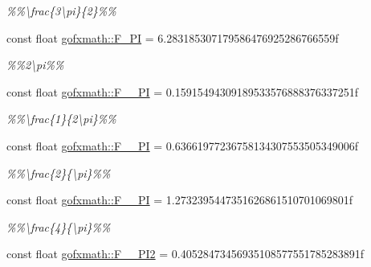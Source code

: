 \begin{DoxyCompactItemize}
\begin{DoxyCompactList}\small\item\em \%\%\textbackslash{}frac\{3\textbackslash{}pi\}\{2\}\%\% \end{DoxyCompactList}\item 
\hypertarget{group___scalar_math_consts_ga1f732c1484129c0ec49718665c5334a9}{}const float \hyperlink{group___scalar_math_consts_ga1f732c1484129c0ec49718665c5334a9}{gofxmath\+::\+F\+\_\+P\+I} = 6.\+283185307179586476925286766559f\label{group___scalar_math_consts_ga1f732c1484129c0ec49718665c5334a9}

\begin{DoxyCompactList}\small\item\em \%\%2\textbackslash{}pi\%\% \end{DoxyCompactList}\item 
\hypertarget{group___scalar_math_consts_ga1e7d6dc0fa11f4284b6f0eaa5b08a351}{}const float \hyperlink{group___scalar_math_consts_ga1e7d6dc0fa11f4284b6f0eaa5b08a351}{gofxmath\+::\+F\+\_\+\_\+P\+I} = 0.\+15915494309189533576888376337251f\label{group___scalar_math_consts_ga1e7d6dc0fa11f4284b6f0eaa5b08a351}

\begin{DoxyCompactList}\small\item\em \%\%\textbackslash{}frac\{1\}\{2\textbackslash{}pi\}\%\% \end{DoxyCompactList}\item 
\hypertarget{group___scalar_math_consts_gaaf7b5cfd9c005c51df9c94cbfeb77b2c}{}const float \hyperlink{group___scalar_math_consts_gaaf7b5cfd9c005c51df9c94cbfeb77b2c}{gofxmath\+::\+F\+\_\+\_\+\+P\+I} = 0.\+63661977236758134307553505349006f\label{group___scalar_math_consts_gaaf7b5cfd9c005c51df9c94cbfeb77b2c}

\begin{DoxyCompactList}\small\item\em \%\%\textbackslash{}frac\{2\}\{\textbackslash{}pi\}\%\% \end{DoxyCompactList}\item 
\hypertarget{group___scalar_math_consts_ga17543086409760281a83ba571b38eda4}{}const float \hyperlink{group___scalar_math_consts_ga17543086409760281a83ba571b38eda4}{gofxmath\+::\+F\+\_\+\_\+\+P\+I} = 1.\+2732395447351626861510701069801f\label{group___scalar_math_consts_ga17543086409760281a83ba571b38eda4}

\begin{DoxyCompactList}\small\item\em \%\%\textbackslash{}frac\{4\}\{\textbackslash{}pi\}\%\% \end{DoxyCompactList}\item 
\hypertarget{group___scalar_math_consts_ga6e0a91cbc33147860a0af980969f00aa}{}const float \hyperlink{group___scalar_math_consts_ga6e0a91cbc33147860a0af980969f00aa}{gofxmath\+::\+F\+\_\+\_\+\+P\+I2} = 0.\+40528473456935108577551785283891f\label{group___scalar_math_consts_ga6e0a91cbc33147860a0af980969f00aa}


\end{DoxyCompactItemize}

